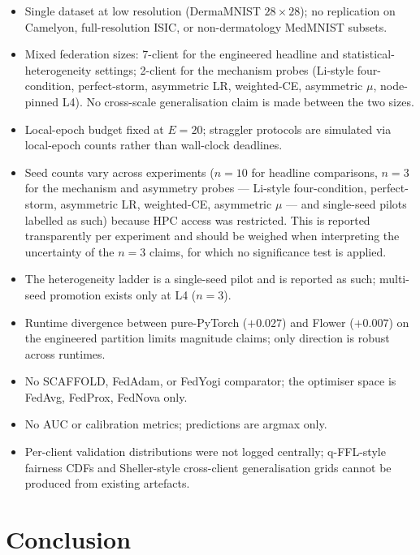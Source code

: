 \documentclass[11pt,a4paper]{report}
\begin{document}
\begin{itemize}
\setlength\itemsep{0.15em}
\item Single dataset at low resolution (DermaMNIST $28 \times 28$); no
replication on Camelyon, full-resolution ISIC, or non-dermatology MedMNIST
subsets.
\item Mixed federation sizes: 7-client for the engineered headline and
statistical-heterogeneity settings; 2-client for the mechanism probes
(Li-style four-condition, perfect-storm, asymmetric LR, weighted-CE,
asymmetric $\mu$, node-pinned L4). No cross-scale generalisation claim is
made between the two sizes.
\item Local-epoch budget fixed at $E = 20$; straggler protocols are
simulated via local-epoch counts rather than wall-clock deadlines.
\item Seed counts vary across experiments ($n = 10$ for headline comparisons,
$n = 3$ for the mechanism and asymmetry probes --- Li-style four-condition,
perfect-storm, asymmetric LR, weighted-CE, asymmetric $\mu$ --- and single-seed
pilots labelled as such) because HPC access was restricted. This is reported
transparently per experiment and should be weighed when interpreting the
uncertainty of the $n = 3$ claims, for which no significance test is applied.
\item The heterogeneity ladder is a single-seed pilot and is reported as
such; multi-seed promotion exists only at L4 ($n = 3$).
\item Runtime divergence between pure-PyTorch ($+0.027$) and Flower
($+0.007$) on the engineered partition limits magnitude claims; only
direction is robust across runtimes.
\item No SCAFFOLD, FedAdam, or FedYogi comparator; the optimiser space is
FedAvg, FedProx, FedNova only.
\item No AUC or calibration metrics; predictions are argmax only.
\item Per-client validation distributions were not logged centrally;
q-FFL-style fairness CDFs and Sheller-style cross-client generalisation
grids cannot be produced from existing artefacts.
\end{itemize}

\section{Conclusion}
\label{sec:conc}
\end{document}

